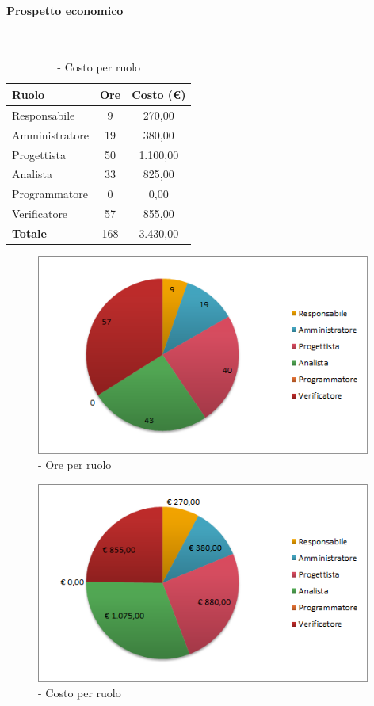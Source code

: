 \documentclass[./PianoDiProgetto.tex]{subfiles}
\begin{document}
	\paragraph{Prospetto economico}\

	\begin{table}[H]
		\centering

		\begin{tabular}{l * {2}{c}}
			\toprule
			\textbf{Ruolo} & \textbf{Ore} & \textbf{Costo (\euro{})} \\
			\midrule
			Responsabile & 9    &  270,00 \\
			Amministratore  & 19     &  380,00 \\
			Progettista  & 50    &  1.100,00 \\
			Analista & 33   &  825,00 \\
			Programmatore  & 0    &  0,00 \\
			Verificatore  & 57    &  855,00 \\
			\midrule
			\textbf{Totale}  & 168   &  3.430,00 \\
			\bottomrule
		\end{tabular}
		\caption{\PerPD{} - Costo per ruolo}

	\end{table}
\vfill
\newpage
\vfill

	\begin{figure}[H]
		\centering
		\includegraphics[width=11cm, trim=1cm 0cm 1cm 0cm]{grafici/Pd-ruolo}
			\caption{\PerPD{}- Ore per ruolo}

	\end{figure}

\vfill
	\begin{figure}[H]
		\centering
		\includegraphics[width=11cm, trim=1cm 0cm 1cm 0cm]{grafici/Pd-costo}
			\caption{\PerPD{} - Costo per ruolo}
	\end{figure}
\vfill
\newpage
\end{document}

